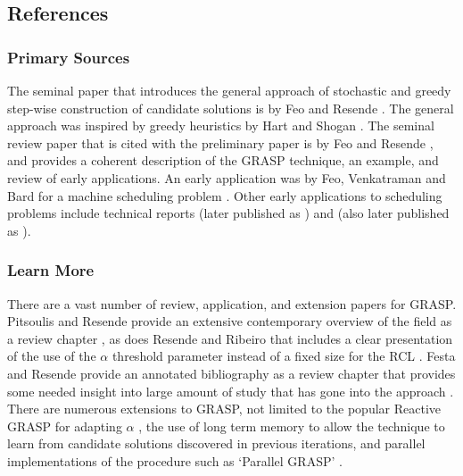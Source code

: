 


\subsection{References}

% 
% 
\subsubsection{Primary Sources}
The seminal paper that introduces the general approach of stochastic and greedy step-wise construction of candidate solutions is by Feo and Resende \cite{Feo1989}. The general approach was inspired by greedy heuristics by Hart and Shogan \cite{Hart1987}. The seminal review paper that is cited with the preliminary paper is by Feo and Resende \cite{Feo1995}, and provides a coherent description of the GRASP technique, an example, and review of early applications.
An early application was by Feo, Venkatraman and Bard for a machine scheduling problem \cite{Feo1991}. Other early applications to scheduling problems include technical reports \cite{Feo1993} (later published as \cite{Bard1996}) and \cite{Feo1994} (also later published as \cite{Feo1996}).

% 
% 
\subsubsection{Learn More}
There are a vast number of review, application, and extension papers for GRASP.
Pitsoulis and Resende provide an extensive contemporary overview of the field as a review chapter \cite{Pitsoulis2002}, as does Resende and Ribeiro that includes a clear presentation of the use of the $\alpha$ threshold parameter instead of a fixed size for the RCL \cite{Resende2003}. Festa and Resende provide an annotated bibliography as a review chapter that provides some needed insight into large amount of study that has gone into the approach \cite{Festa2002}.
There are numerous extensions to GRASP, not limited to the popular Reactive GRASP for adapting $\alpha$ \cite{Prais2000}, the use of long term memory to allow the technique to learn from candidate solutions discovered in previous iterations, and parallel implementations of the procedure such as `Parallel GRASP' \cite{Pardalos1995}.


